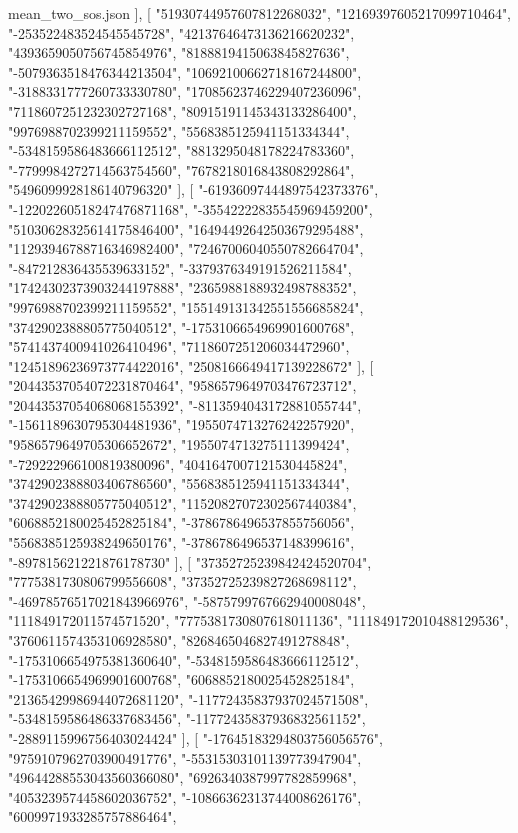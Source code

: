 \begin{filecontents*}[overwrite]{mean_two_sos.json}
   ],
   [
    "51930744957607812268032",
    "12169397605217099710464",
    "-253522483524545545728",
    "42137646473136216620232",
    "4393659050756745854976",
    "8188819415063845827636",
    "-5079363518476344213504",
    "10692100662718167244800",
    "-3188331777260733330780",
    "17085623746229407236096",
    "7118607251232302727168",
    "80915191145343133286400",
    "9976988702399211159552",
    "5568385125941151334344",
    "-5348159586483666112512",
    "8813295048178224783360",
    "-7799984272714563754560",
    "7678218016843808292864",
    "5496099928186140796320"
   ],
   [
    "-61936097444897542373376",
    "-12202260518247476871168",
    "-35542222835545969459200",
    "51030628325614175846400",
    "16494492642503679295488",
    "11293946788716346982400",
    "72467006040550782664704",
    "-847212836435539633152",
    "-3379376349191526211584",
    "17424302373903244197888",
    "2365988188932498788352",
    "9976988702399211159552",
    "155149131342551556685824",
    "3742902388805775040512",
    "-1753106654969901600768",
    "5741437400941026410496",
    "7118607251206034472960",
    "12451896236973774422016",
    "2508166649417139228672"
   ],
   [
    "20443537054072231870464",
    "9586579649703476723712",
    "20443537054068068155392",
    "-8113594043172881055744",
    "-1561189630795304481936",
    "1955074713276242257920",
    "9586579649705306652672",
    "1955074713275111399424",
    "-729222966100819380096",
    "4041647007121530445824",
    "3742902388803406786560",
    "5568385125941151334344",
    "3742902388805775040512",
    "11520827072302567440384",
    "6068852180025452825184",
    "-3786786496537855756056",
    "5568385125938249650176",
    "-3786786496537148399616",
    "-897815621221876178730"
   ],
   [
    "37352725239842424520704",
    "7775381730806799556608",
    "37352725239827268698112",
    "-46978576517021843966976",
    "-5875799767662940008048",
    "111849172011574571520",
    "7775381730807618011136",
    "111849172010488129536",
    "3760611574353106928580",
    "8268465046827491278848",
    "-1753106654975381360640",
    "-5348159586483666112512",
    "-1753106654969901600768",
    "6068852180025452825184",
    "21365429986944072681120",
    "-11772435837937024571508",
    "-5348159586486337683456",
    "-11772435837936832561152",
    "-2889115996756403024424"
   ],
   [
    "-17645183294803756056576",
    "9759107962703900491776",
    "-55315303101139773947904",
    "49644288553043560366080",
    "6926340387997782859968",
    "4053239574458602036752",
    "-10866362313744008626176",
    "6009971933285757886464",

\end{filecontents*}

